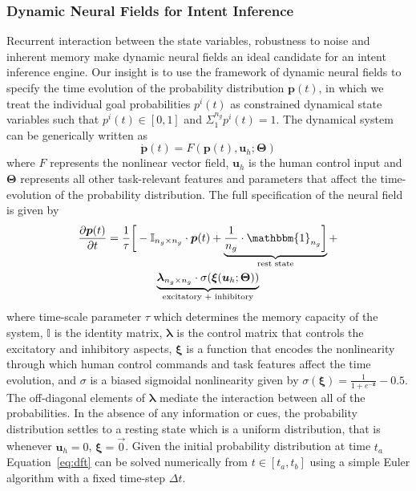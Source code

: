 \subsubsection{Dynamic Neural Fields for Intent Inference}\label{sssec:dft_ii}

Recurrent interaction between the state variables, 
robustness to noise and inherent memory make dynamic neural fields an ideal candidate for an intent inference engine. Our insight is to use the framework of dynamic neural fields to specify the time evolution of the probability distribution $\boldsymbol{p}(t)$, in which we treat the individual goal probabilities $p^i(t)$ as constrained dynamical state variables such that $p^i(t) \in [0, 1]$ and $\Sigma_{1}^{n_g}p^{i}(t) = 1$. The dynamical system can be generically written as 
\begin{equation*}
\dot{\boldsymbol{p}}(t) = F(\boldsymbol{p}(t), \boldsymbol{u}_h ; \boldsymbol{\Theta})
\end{equation*}
where $F$ represents the nonlinear vector field, $\boldsymbol{u}_h$ is the human control input and $\boldsymbol{\Theta}$ represents all other task-relevant features and parameters that affect the time-evolution of the probability distribution. 
The full specification of the neural field is given by
\begin{multline}\label{eq:dft}
\frac{\partial \boldsymbol{p}(t)}{\partial t} = \frac{1}{\tau}\bigg[-\mathbb{I}_{n_g\times n_g}\cdot\boldsymbol{p}(t) + \underbrace{\frac{1}{n_g}\cdot\mathbbm{1}_{n_g}\bigg]}_{\text{rest state}} + \\ \underbrace{\boldsymbol{\lambda}_{n_g\times n_g}\cdot\sigma(\boldsymbol{\xi}(\boldsymbol{u}_h;\boldsymbol{\Theta}))}_{\text{excitatory + inhibitory}}
\end{multline}
where time-scale parameter $\tau$ which determines the memory capacity of the system, $\mathbb{I}$ is the identity matrix, $\boldsymbol{\lambda}$ is the control matrix that controls the excitatory and inhibitory aspects, $\boldsymbol{\xi}$ is a function that encodes the nonlinearity through which human control commands and task features affect the time evolution, and $\sigma$ is a biased sigmoidal nonlinearity given by $\sigma(\boldsymbol{\xi}) = \frac{1}{1 + e^{-\boldsymbol{z}}} - 0.5$.
The off-diagonal elements of $\boldsymbol{\lambda}$ mediate the interaction between all of the probabilities. In the absence of any information or cues, the probability distribution settles to a resting state which is a uniform distribution, that is whenever $\boldsymbol{u}_h = 0$, $\boldsymbol{\xi} = \vec{0}$. Given the initial probability distribution at time $t_a$ Equation~\ref{eq:dft} can be solved numerically from $t \in [t_a, t_b]$ using a simple Euler algorithm with a fixed time-step $\Delta t$.

